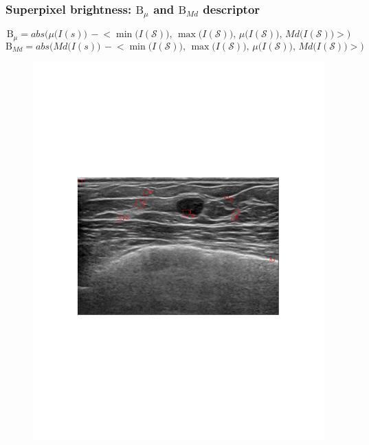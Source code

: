 \begin{frame}\frametitle{Superpixel brightness: $\text{B}_\mu$ and $\text{B}_{Md}$ descriptor}
\begin{scriptsize}
\vspace{-10pt}
\begin{equation*}
\text{B}_\mu = abs\bigg(\mu\Big(I(s)\Big)\,-\Big<\min\Big(I( \mathcal{S})\Big),\,\max\Big(I( \mathcal{S})\Big),\,\mu\Big(I( \mathcal{S})\Big),\,Md\Big(I( \mathcal{S})\Big)\Big>\bigg)
\end{equation*}
\begin{equation*}
\text{B}_{Md}=abs\bigg(Md\Big(I(s)\Big)\,-\Big<\min\Big(I( \mathcal{S})\Big),\,\max\Big(I( \mathcal{S})\Big),\,\mu\Big(I( \mathcal{S})\Big),\,Md\Big(I( \mathcal{S})\Big)\Big>\bigg) 
\end{equation*}
\end{scriptsize}
\vspace{-5pt}
\begin{figure}[Htbp]
\centering
 \includegraphics[trim = 91 300 100 242, clip,height=.5\textheight]{brightnessAparence/appearance1.pdf}

\end{figure}
\end{frame}
